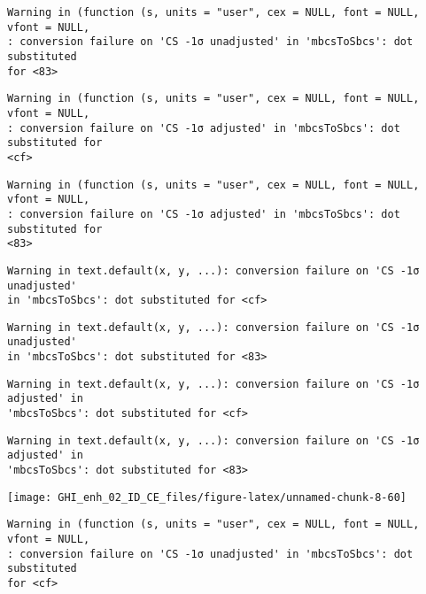 \documentclass[
  10pt,
  a4paper,oneside]{article}
\begin{document}
\begin{verbatim}
Warning in (function (s, units = "user", cex = NULL, font = NULL, vfont = NULL,
: conversion failure on 'CS -1σ unadjusted' in 'mbcsToSbcs': dot substituted
for <83>
\end{verbatim}

\begin{verbatim}
Warning in (function (s, units = "user", cex = NULL, font = NULL, vfont = NULL,
: conversion failure on 'CS -1σ adjusted' in 'mbcsToSbcs': dot substituted for
<cf>
\end{verbatim}

\begin{verbatim}
Warning in (function (s, units = "user", cex = NULL, font = NULL, vfont = NULL,
: conversion failure on 'CS -1σ adjusted' in 'mbcsToSbcs': dot substituted for
<83>
\end{verbatim}

\begin{verbatim}
Warning in text.default(x, y, ...): conversion failure on 'CS -1σ unadjusted'
in 'mbcsToSbcs': dot substituted for <cf>
\end{verbatim}

\begin{verbatim}
Warning in text.default(x, y, ...): conversion failure on 'CS -1σ unadjusted'
in 'mbcsToSbcs': dot substituted for <83>
\end{verbatim}

\begin{verbatim}
Warning in text.default(x, y, ...): conversion failure on 'CS -1σ adjusted' in
'mbcsToSbcs': dot substituted for <cf>
\end{verbatim}

\begin{verbatim}
Warning in text.default(x, y, ...): conversion failure on 'CS -1σ adjusted' in
'mbcsToSbcs': dot substituted for <83>
\end{verbatim}

\begin{center}\texttt{[image: GHI\_enh\_02\_ID\_CE\_files/figure-latex/unnamed-chunk-8-60]} \end{center}

\begin{verbatim}
Warning in (function (s, units = "user", cex = NULL, font = NULL, vfont = NULL,
: conversion failure on 'CS -1σ unadjusted' in 'mbcsToSbcs': dot substituted
for <cf>
\end{verbatim}
\end{document}
